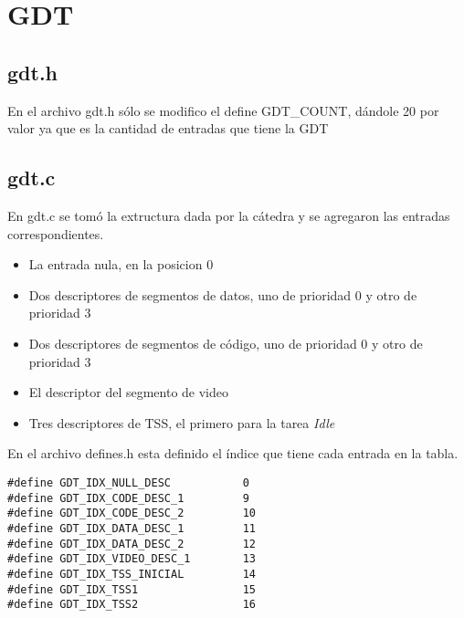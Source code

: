 
\section{GDT}
\subsection{gdt.h}
En el archivo gdt.h s\'olo se modifico el define GDT_COUNT, d\'andole 20 por valor ya que es la cantidad de entradas que tiene la GDT

\subsection{gdt.c}
En gdt.c se tom\'o la extructura dada por la c\'atedra y se agregaron las entradas correspondientes.

\begin{itemize}
	\item La entrada nula, en la posicion 0
	
	\item Dos descriptores de segmentos de datos, uno de prioridad 0 y otro de prioridad 3

	\item Dos descriptores de segmentos de c\'odigo, uno de prioridad 0 y otro de prioridad 3
	
	\item El descriptor del segmento de video
	
	\item Tres descriptores de TSS, el primero para la tarea \textit{Idle}
\end{itemize}

En el archivo defines.h esta definido el \'indice que tiene cada entrada en la tabla.


\begin{codesnippet}
\begin{verbatim}
#define GDT_IDX_NULL_DESC           0
#define GDT_IDX_CODE_DESC_1			9
#define GDT_IDX_CODE_DESC_2			10
#define GDT_IDX_DATA_DESC_1			11
#define GDT_IDX_DATA_DESC_2			12
#define GDT_IDX_VIDEO_DESC_1		13
#define GDT_IDX_TSS_INICIAL			14
#define GDT_IDX_TSS1				15
#define GDT_IDX_TSS2				16
\end{verbatim}
\end{codesnippet}
